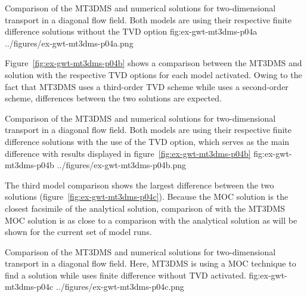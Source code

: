 \begin{StandardFigure}
	{Comparison of the MT3DMS and \mf numerical solutions for two-dimensional transport in a diagonal flow field. Both models are using their respective finite difference solutions without the TVD option} 
	{fig:ex-gwt-mt3dms-p04a}
	{../figures/ex-gwt-mt3dms-p04a.png}
\end{StandardFigure}

Figure~\ref{fig:ex-gwt-mt3dms-p04b} shows a comparison between the MT3DMS and \mf solution with the respective TVD options for each model activated.  Owing to the fact that MT3DMS uses a third-order TVD scheme while \mf uses a second-order scheme, differences between the two solutions are expected. 

\begin{StandardFigure}
	{Comparison of the MT3DMS and \mf numerical solutions for two-dimensional transport in a diagonal flow field. Both models are using their respective finite difference solutions with the use of the TVD option, which serves as the main difference with results displayed in figure~\ref{fig:ex-gwt-mt3dms-p04b}} 
	{fig:ex-gwt-mt3dms-p04b}
	{../figures/ex-gwt-mt3dms-p04b.png}
\end{StandardFigure}

The third model comparison shows the largest difference between the two solutions (figure~\ref{fig:ex-gwt-mt3dms-p04c}). Because the MOC solution is the closest facsimile of the analytical solution, comparison of \mf with the MT3DMS MOC solution is as close to a comparison with the analytical solution as will be shown for the current set of model runs. 

\begin{StandardFigure}
	{Comparison of the MT3DMS and \mf numerical solutions for two-dimensional transport in a diagonal flow field. Here, MT3DMS is using a MOC technique to find a solution while \mf uses finite difference without TVD activated.} 
	{fig:ex-gwt-mt3dms-p04c}
	{../figures/ex-gwt-mt3dms-p04c.png}
\end{StandardFigure}



